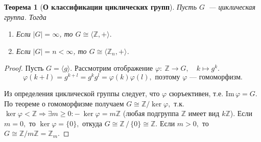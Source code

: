 \documentclass[a4paper, 14pt]{extarticle}
\newcommand{\n}{\par}
\newcommand{\integers}{\mathbb{Z}}
\newcommand{\suchthat}{{:}{-} \ }
\newcommand{\im}{\mathrm{Im} \,}
\renewcommand{\phi}{\varphi}
\theoremstyle{definition}
\theoremstyle{plain}
\newtheorem*{theorem*}{Теорема}
\numberwithin{theorem}{section}
\numberwithin{definition}{section}
\numberwithin{statement}{section}
\numberwithin{lemma}{section}
\numberwithin{consequence}{section}
\begin{document}
	\newpage
	\begin{theorem*}[\textbf{О классификации циклических групп}]
		Пусть $G$~--- циклическая группа. Тогда
		\begin{enumerate}
			\setlength\itemsep{0.1em}
			\item Если $|G| = \infty$, то $G \cong \langle \integers, + \rangle.$
			\item Если $|G| = n < \infty$, то $G \cong \langle \integers_n, + \rangle$.
		\end{enumerate}
	\end{theorem*}
	\begin{proof}
		Пусть ${G = \langle g \rangle.}$ Рассмотрим отображение $\phi{:} \ \integers \rightarrow G, \quad k \mapsto g^k.$
		\begin{equation*}
			\phi(k + l) = g^{k+l} = g^kg^l =
			\phi(k) \phi(l), \text{ поэтому } \phi \text{~--- гомоморфизм.}
		\end{equation*} \n
		Из определения циклической группы следует, что $\phi$ сюръективен, т.е. $\im \phi = G$. По теореме о гомоморфизме получаем ${G \cong \integers/\ker \phi,}$ т.к. ${\ker \phi < \integers \Longrightarrow \exists m \geqslant 0 \suchthat \ker \phi = m \integers}$ (любая подгруппа $\integers$ имеет вид $k\integers$). Если ${m = 0},$ то ${\ker \phi = \{0\},}$ откуда ${G \cong \integers \, / \, \{0\} \cong \integers.}$ Если ${m > 0,}$ то ${G \cong \integers/m\integers = \integers_m.}$
	\end{proof}
	
	\newpage
\end{document}
